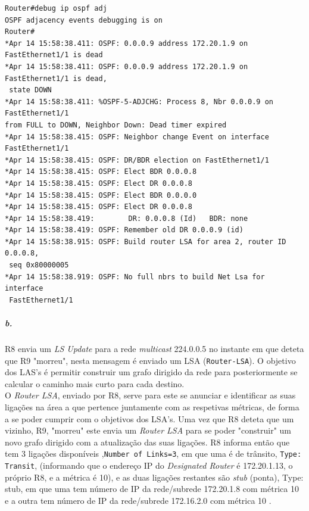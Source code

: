 \begin{verbatim}
Router#debug ip ospf adj 
OSPF adjacency events debugging is on
Router#
*Apr 14 15:58:38.411: OSPF: 0.0.0.9 address 172.20.1.9 on FastEthernet1/1 is dead
*Apr 14 15:58:38.411: OSPF: 0.0.0.9 address 172.20.1.9 on FastEthernet1/1 is dead,
 state DOWN
*Apr 14 15:58:38.411: %OSPF-5-ADJCHG: Process 8, Nbr 0.0.0.9 on FastEthernet1/1 
from FULL to DOWN, Neighbor Down: Dead timer expired
*Apr 14 15:58:38.415: OSPF: Neighbor change Event on interface FastEthernet1/1
*Apr 14 15:58:38.415: OSPF: DR/BDR election on FastEthernet1/1 
*Apr 14 15:58:38.415: OSPF: Elect BDR 0.0.0.8
*Apr 14 15:58:38.415: OSPF: Elect DR 0.0.0.8
*Apr 14 15:58:38.415: OSPF: Elect BDR 0.0.0.0
*Apr 14 15:58:38.415: OSPF: Elect DR 0.0.0.8
*Apr 14 15:58:38.419:        DR: 0.0.0.8 (Id)   BDR: none 
*Apr 14 15:58:38.419: OSPF: Remember old DR 0.0.0.9 (id)
*Apr 14 15:58:38.915: OSPF: Build router LSA for area 2, router ID 0.0.0.8, 
 seq 0x80000005
*Apr 14 15:58:38.919: OSPF: No full nbrs to build Net Lsa for interface 
 FastEthernet1/1
\end{verbatim}

\newpage

\subparagraph{b.}
\textsf{R8} envia um \emph{LS Update} para a rede \emph{multicast} 224.0.0.5 no instante em que deteta que \textsf{R9} "morreu", nesta mensagem é enviado um LSA (\texttt{Router-LSA}).
O objetivo dos LAS's é permitir construir um grafo dirigido da rede para posteriormente se calcular o caminho mais curto para cada destino.\\
O \emph{Router LSA}, enviado por \textsf{R8}, serve para este se anunciar e identificar as suas ligações na área a que pertence juntamente com as respetivas métricas, de forma a se poder cumprir com o objetivos dos LSA's. Uma vez que \textsf{R8} deteta que um vizinho, \textsf{R9}, "morreu" este envia um \emph{Router LSA} para se poder "construir" um novo grafo dirigido com a atualização das suas ligações. \textsf{R8} informa então que tem 3 ligações disponíveis ,\texttt{Number of Links=3}, em que uma é de trânsito, \texttt{Type: Transit}, (informando que o endereço IP do \emph{Designated Router} é 172.20.1.13, o próprio \textsf{R8}, e a métrica é 10), e as duas ligações restantes são \emph{stub} (ponta), \textsf{Type: stub}, em que uma tem número de IP da rede/subrede 172.20.1.8 com métrica 10 e a outra tem número de IP da rede/subrede 172.16.2.0 com métrica 10 .


